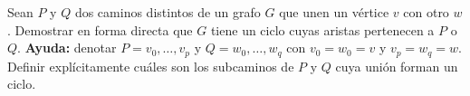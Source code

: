 

\item\Obligatorio Sean $P$ y $Q$ dos caminos distintos de un grafo $G$ que unen un vértice $v$ con otro $w$. Demostrar en forma directa que $G$ tiene un ciclo cuyas aristas pertenecen a $P$ o $Q$.  \textbf{Ayuda:} denotar $P = v_0, \ldots, v_p$ y $Q = w_0, \ldots, w_q$ con $v_0 = w_0 = v$ y $v_p = w_q = w$.  Definir explícitamente cuáles son los subcaminos de $P$ y $Q$ cuya unión forman un ciclo.




